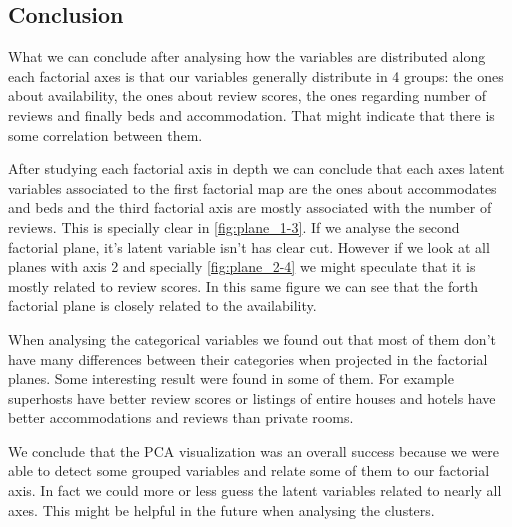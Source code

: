 \subsection{Conclusion}%
What we can conclude after analysing how the variables are distributed along each factorial axes is 
that our variables generally distribute in 4 groups: the ones about availability,   
the ones about review scores, the ones regarding number of reviews and finally beds and accommodation. That might indicate that there is some correlation between them.

After studying each factorial axis in depth we can conclude that each axes
latent variables associated to the first factorial map are the ones about accommodates and beds and the third factorial axis are mostly associated with 
the number of reviews. This is specially clear in \cref{fig:plane_1-3}. If we analyse the second factorial plane, it's latent variable isn't has clear cut.
However if we look at all planes with axis 2 and specially \cref{fig:plane_2-4}
we might speculate that it is mostly related to review scores. In this same figure we can see that the forth factorial plane is closely related to the availability.

When analysing the categorical variables we found out that most of them don't have many differences between their categories when projected in the factorial planes. Some interesting result were found in some of them. For example superhosts have better review scores or listings of entire houses and hotels have better accommodations and reviews than private rooms.

We conclude that the PCA visualization was an overall success because we were able to detect some grouped variables and relate some of them to our factorial axis. In fact we could more or less guess the latent variables related to
nearly all axes. This might be helpful in the future when analysing the clusters.








